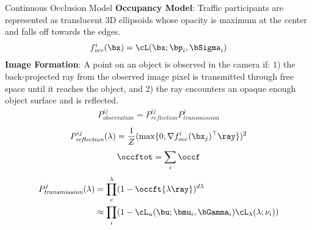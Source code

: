 \documentclass[handout,final]{beamer}
\newcommand{\meandepth}[1]{\nu_#1}
\newlength{\onecolwid}
\begin{document}
\begin{frame}[t]
\begin{columns}[t]
\begin{column}{\onecolwid}
      \begin{block}{Continuous Occlusion Model}
		\textbf{Occupancy Model}: Traffic participants are represented as translucent 3D ellipsoids whose opacity is maximum at the center and falls off towards the edges.
        \begin{align}
          f^i_{\textit{occ}}(\bx) = \cL(\bx; \bp_i, \bSigma_i)
        \end{align}
		\textbf{Image Formation}: A point on an object is observed in the camera if: 1) the back-projected ray from the observed image pixel is transmitted through free space until it reaches the object, and 2) the ray encounters an opaque enough object surface and is reflected.		
        \begin{align}
          P^{ij}_{\textit{observation}} = P^{ij}_{\textit{reflection}}P^{j}_{\textit{transmission}}
        \end{align}
        \begin{align}
          P^{ij}_{\textit{reflection}}(\lambda) = \frac{1}{Z}(\max \{0, \nabla {f^i_{occ}}(\bx_j)^\top \ray \})^2
        \end{align}
        \begin{align}
	        \occftot = \sum_i \occf      
        \end{align}
        \begin{align}
          P^{j}_{\textit{transmission}}(\lambda) &= \prod_{c}^{\lambda} (1 - \occft{\lambda \ray})^{d\lambda}\\
          &\approx \prod_i (1 - \cL_u (\bu; \bmu_i, \bGamma_i) \cL_{\lambda}(\lambda; \meandepth{i}))
        \end{align}


\end{block}
\end{column}
\end{columns}
\end{frame}
\end{document}
